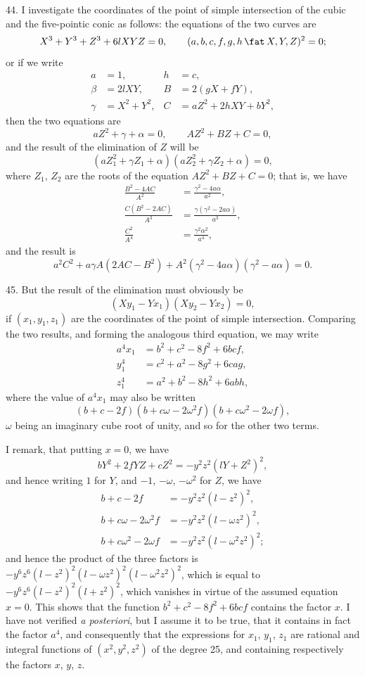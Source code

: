 \documentclass[11pt,a4paper]{article}
\theoremstyle{definition}
\begin{document}
44. I investigate the coordinates of the point of simple intersection of the cubic and the five-pointic conic as follows: the equations of the two curves are
\[
X^3+Y^3+Z^3+6lXYZ=0,\qquad (a,b,c,f,g,h\,\fat\, X,Y,Z)^2=0;
\]
or if we write
\begin{align*}
a &= 1, & h &= c,\\
\beta &= 2lXY, & B &= 2(gX+fY),\\
\gamma &= X^2+Y^2, & C &= aZ^2+2hXY+bY^2,
\end{align*}
then the two equations are
\[
aZ^2+\gamma+\alpha=0,\qquad AZ^2+BZ+C=0,
\]
and the result of the elimination of $Z$ will be
\[
(aZ_1^2+\gamma Z_1+\alpha)(aZ_2^2+\gamma Z_2+\alpha)=0,
\]
where $Z_1$, $Z_2$ are the roots of the equation $AZ^2+BZ+C=0$; that is, we have
\begin{align*}
\frac{B^2-4AC}{A^2} &= \frac{\gamma^2-4a\alpha}{a^2},\\
\frac{C(B^2-2AC)}{A^3} &= \frac{\gamma(\gamma^2-2a\alpha)}{a^3},\\
\frac{C^2}{A^4} &= \frac{\gamma^2\alpha^2}{a^4},
\end{align*}
and the result is
\[
a^2C^2+a\gamma A(2AC-B^2)+A^2(\gamma^2-4a\alpha)(\gamma^2-a\alpha)=0.
\]

45. But the result of the elimination must obviously be
\[
(Xy_1-Yx_1)(Xy_2-Yx_2)=0,
\]
if $(x_1,y_1,z_1)$ are the coordinates of the point of simple intersection. Comparing the two results, and forming the analogous third equation, we may write
\begin{align*}
a^4x_1 &= b^2+c^2-8f^2+6bcf,\\
y_1^4 &= c^2+a^2-8g^2+6cag,\\
z_1^4 &= a^2+b^2-8h^2+6abh,
\end{align*}
where the value of $a^4x_1$ may also be written
\[
(b+c-2f)(b+c\omega-2\omega^2f)(b+c\omega^2-2\omega f),
\]
$\omega$ being an imaginary cube root of unity, and so for the other two terms.

I remark, that putting $x=0$, we have
\[
bY^2+2fYZ+cZ^2=-y^2z^2(lY+Z^2)^2,
\]
and hence writing $1$ for $Y$, and $-1$, $-\omega$, $-\omega^2$ for $Z$, we have
\begin{align*}
b+c-2f &= -y^2z^2(l-z^2)^2,\\
b+c\omega-2\omega^2f &= -y^2z^2(l-\omega z^2)^2,\\
b+c\omega^2-2\omega f &= -y^2z^2(l-\omega^2z^2)^2;
\end{align*}
and hence the product of the three factors is $-y^6z^6(l-z^2)^2(l-\omega z^2)^2(l-\omega^2z^2)^2$, which is equal to $-y^6z^6(l-z^2)^2(l+z^2)^2$, which vanishes in virtue of the assumed equation $x=0$. This shows that the function $b^2+c^2-8f^2+6bcf$ contains the factor $x$. I have not verified \textit{a posteriori}, but I assume it to be true, that it contains in fact the factor $a^4$, and consequently that the expressions for $x_1$, $y_1$, $z_1$ are rational and integral functions of $(x^2,y^2,z^2)$ of the degree 25, and containing respectively the factors $x$, $y$, $z$.
\end{document}
